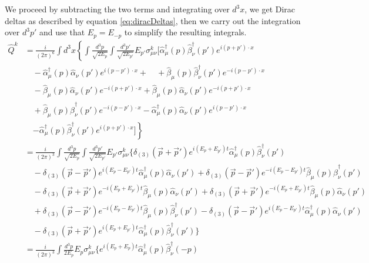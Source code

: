 We proceed by subtracting the two terms  and integrating over $d^3 x$,  we get Dirac deltas as described by equation \eqref{eq:diracDeltas}, then we carry out the integration over $d^3 p'$ and use that $E_p=E_{-p}$ to simplify the resulting integrals. 
\begin{align*}
    \hat Q^k &= \frac{i}{(2\pi)^6}  \int d^3 x \left\{  \int \frac{d^3 p}{\sqrt{2E_p}} \int \frac{d^3 p'}{\sqrt{2E_{p'}}} E_{p'}  \sigma^k_{\mu\nu} \bigg[  \hat{\alpha}_\mu^\dagger (p) \hat{\beta}_\nu^\dagger (p') e^{i(p+p')\cdot x} \right. \\
    &\quad -  \hat{\alpha}_\mu^\dagger (p) \hat{\alpha}_\nu (p') e^{i(p-p')\cdot x} + \quad +  \hat{\beta}_\mu (p) \hat{\beta}_\nu^\dagger (p') e^{-i(p-p')\cdot x} \\
    &\quad -  \hat{\beta}_\mu (p) \hat{\alpha}_\nu (p') e^{-i(p+p')\cdot x} + \hat{\beta}_\mu (p) \hat{\alpha}_\nu (p') e^{-i(p+p')\cdot x} \\
    &\quad + \hat{\beta}_\mu (p) \hat{\beta}_\nu^\dagger (p') e^{-i(p-p')\cdot x}  - \hat{\alpha}_\mu^\dagger (p) \hat{\alpha}_\nu (p') e^{i(p-p')\cdot x} \\
    &\quad \left. - \hat{\alpha}_\mu^\dagger (p) \hat{\beta}_\nu^\dagger (p') e^{i(p+p')\cdot x} \bigg]\right\}\\
    &= \frac{i}{(2\pi)^3} \int \frac{d^3 p}{\sqrt{2E_p}} \int \frac{d^3 p'}{\sqrt{2E_{p'}}} E_{p'} \sigma^k_{\mu\nu} \bigg\{ \delta_{(3)}(\vec{p}+\vec{p}') e^{i(E_p+E_{p'})t} \hat{\alpha}_\mu^\dagger (p) \hat{\beta}_\nu^\dagger (p') \\
    &\quad - \delta_{(3)}(\vec{p}-\vec{p}') e^{i(E_p-E_{p'})t} \hat{\alpha}_\mu^\dagger (p) \hat{\alpha}_\nu (p')+ \delta_{(3)}(\vec{p}-\vec{p}') e^{-i(E_p-E_{p'})t} \hat{\beta}_\mu (p) \hat{\beta}_\nu^\dagger (p') \\
    &\quad - \delta_{(3)}(\vec{p}+\vec{p}') e^{-i(E_p+E_{p'})t} \hat{\beta}_\mu (p) \hat{\alpha}_\nu (p') + \delta_{(3)}(\vec{p}+\vec{p}') e^{-i(E_p+E_{p'})t} \hat{\beta}_\mu (p) \hat{\alpha}_\nu (p') \\
    &\quad + \delta_{(3)}(\vec{p}-\vec{p}') e^{-i(E_p-E_{p'})t} \hat{\beta}_\mu (p) \hat{\beta}_\nu^\dagger (p') - \delta_{(3)}(\vec{p}-\vec{p}') e^{i(E_p-E_{p'})t} \hat{\alpha}_\mu^\dagger (p) \hat{\alpha}_\nu (p') \\
    &\quad - \delta_{(3)}(\vec{p}+\vec{p}') e^{i(E_p+E_{p'})t} \hat{\alpha}_\mu^\dagger (p) \hat{\beta}_\nu^\dagger (p') \bigg\}\\
    &= \frac{i}{(2\pi)^3} \int \frac{d^3 p}{2E_p} E_p \sigma^k_{\mu\nu} \bigg\{ e^{i(E_p+E_p)t} \hat{\alpha}_\mu^\dagger (p) \hat{\beta}_\nu^\dagger (-p) \\

\end{align*}
